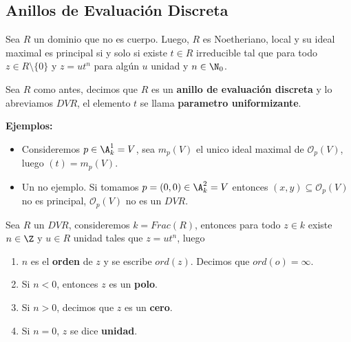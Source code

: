 \documentclass{article}
\begin{document}
\subsection{Anillos de Evaluación Discreta}
\begin{prop}
    Sea $R$ un dominio que no es cuerpo. Luego, $R$ es Noetheriano, local y su ideal maximal es
    principal si y solo si existe $t\in R$ irreducible tal que para todo $z\in R\setminus\{0\}$ y
    $z=ut^{n}$ para algún $u$ unidad y $n\in\N_{0}$.
\end{prop}
\begin{dfn}
    Sea $R$ como antes, decimos que $R$ es un \textbf{anillo de evaluación discreta} y lo 
    abreviamos $DVR$, el elemento $t$ se llama \textbf{parametro uniformizante}.
\end{dfn}
\noindent\textbf{Ejemplos:}
\begin{itemize}
    \item Consideremos $p\in\A_{k}^{1}=V$, sea $m_{p}(V)$ el unico ideal maximal de 
    $\mathcal{O}_{p}(V)$, luego $(t)=m_{p}(V)$.
    
    \item Un no ejemplo. Si tomamos $p=(0,0)\in\A_{k}^{2}=V$ entonces $(x,y)\subseteq\mathcal{O}_{p}(V)$
    no es principal, $\mathcal{O}_{p}(V)$ no es un $DVR$.
\end{itemize}
\begin{dfn}
    Sea $R$ un $DVR$, consideremos $k=Frac(R)$, entonces para todo $z\in k$ existe $n\in\Z$ y 
    $u\in R$ unidad tales que $z=ut^{n}$, luego
    \begin{enumerate}
        \item $n$ es el \textbf{orden} de $z$ y se escribe $ord(z)$. Decimos que $ord(o)=\infty$.
        
        \item Si $n<0$, entonces $z$ es un \textbf{polo}.
        
        \item Si $n>0$, decimos que $z$ es un \textbf{cero}.
        
        \item Si $n=0$, $z$ se dice \textbf{unidad}.
    \end{enumerate}
\end{dfn}
\end{document}

